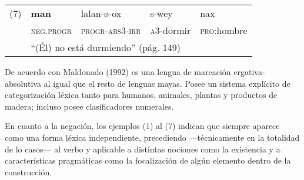 {      %
      \begin{tabular}{rllll}
            \multicolumn{1}{l}{(7)} & \textbf{man}                                            & lalan-ø-ox              & s-wey              & nax                 \\
                                    & \textsc{neg.progr}                                      & \textsc{progr-abs3-irr} & \textsc{a3}-dormir & \textsc{pro}:hombre \\
                                    & \multicolumn{4}{l}{“(Él) no está durmiendo” (pág. 149)}                                                                      \\
      \end{tabular} \vspace{0.3cm}
}

De acuerdo con Maldonado (1992) es una lengua de marcación ergativa-absolutiva al igual que el resto de lenguas mayas. Posee un sistema explícito de categorización léxica tanto para humanos, animales, plantas y productos de madera; incluso posee clasificadores numerales.

En cuanto a la negación, los ejemplos (1) al (7) indican que siempre aparece como una forma léxica independiente, precediendo —técnicamente en la totalidad de lo casos— al verbo y aplicable a distintas nociones como la existencia y a características pragmáticas como la focalización de algún elemento dentro de la construcción.
